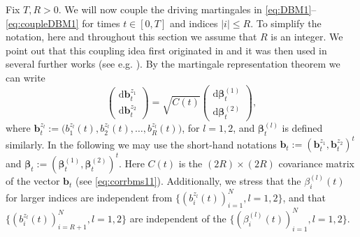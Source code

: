 \documentclass[10pt]{amsart}
\numberwithin{equation}{section}
\newcommand{\rd}{\mathrm{d}}
\begin{document}
Fix $T, R>0$. We will now couple the driving martingales in \eqref{eq:DBM1}--\eqref{eq:coupleDBM1} for times $t\in [0,T]$ and indices $|i|\le R$. To simplify the notation, here and throughout this section we assume that $R$ is an integer. We point out that this coupling idea first originated in \cite{macroCLT_complex} and it was then used in several further works (see e.g. \cite{minor, bao2025numerical, bourgade2024fluctuations, cipolloni2023quenched, Cipolloni_meso, cipolloni2024maximum}).  By the martingale representation theorem \cite[Theorem~18.12]{Kallenberg} we can write
\begin{equation}
\label{eq:coupl1}
\left(\begin{matrix}
\rd \mathbf{b}_t^{z_1} \\
\rd \mathbf{b}_t^{z_2}
\end{matrix}\right)=\sqrt{C(t)}\left(\begin{matrix}
\rd \mathbf{\bm \beta}_t^{(1)} \\
\rd \mathbf{\bm \beta}_t^{(2)}
\end{matrix}\right),
\end{equation}
where $\mathbf{b}_t^{z_l}:=\big(b_1^{z_l}(t), b_2^{z_l}(t), \dots, b_R^{z_l}(t)\big)$, for $l=1,2$, and ${\bm \beta}_t^{(l)}$ is defined similarly.  In the following we may use the short-hand notations $\mathbf{b}_t:=(\mathbf{b}_t^{z_1}, \mathbf{b}_t^{z_2})^t$ and ${\bm \beta}_t:=({\bm \beta}_t^{(1)},{\bm \beta}_t^{(2)})^t$. Here $C(t)$ is the  $(2R) \times (2R)$ covariance matrix of the vector $\mathbf{b}_t$ (see \eqref{eq:corrbms11}). Additionally, we stress that the $\beta_i^{(l)}(t)$ for larger indices are independent from $\{(b_i^{z_l}(t))_{i=1}^N, l=1,2\}$, and that $\{(b_i^{z_l}(t))_{i=R+1}^N, l=1,2\}$ are independent of the $\{(\beta_i^{(l)}(t))_{i=1}^N, l=1,2\}$.  
\end{document}
